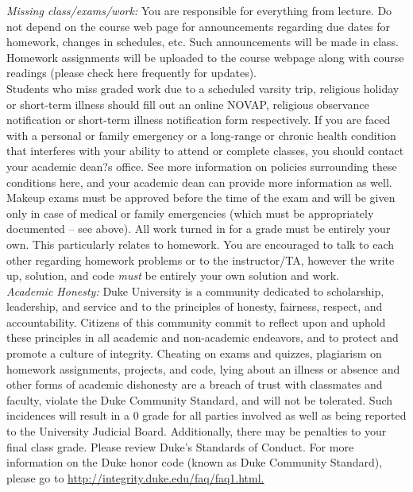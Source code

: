 \documentclass[11pt]{article}
\begin{document}


\emph{Missing class/exams/work:}
You are responsible for everything from lecture. Do not depend on the course web page for announcements regarding due dates for homework, changes in schedules, etc. Such announcements will be made in class. Homework assignments will be uploaded to the course webpage along with course readings (please check here frequently for updates).\\

Students who miss graded work due to a scheduled varsity trip, religious holiday or short-term illness should fill out an online NOVAP, religious observance notification or short-term illness notification form respectively. If you are faced with a personal or family emergency or a long-range or chronic health condition that interferes with your ability to attend or complete classes, you should contact your academic dean?s office. See more information on policies surrounding these conditions here, and your academic dean can provide more information as well.\\

Makeup exams must be approved before the time of the exam and will be given only in case
of medical or family emergencies (which must be appropriately documented -- see above). All work turned in for a grade must be entirely your own. This particularly relates to homework. You are encouraged to talk to each other regarding homework problems or to the instructor/TA, however the write up, solution, and code \emph{must} be entirely your own solution and work. \\


\emph{Academic Honesty:} Duke University is a community dedicated to scholarship, leadership, and service and to the principles of honesty, fairness, respect, and accountability. Citizens of this community commit to reflect upon and uphold these principles in all academic and non-academic endeavors, and to protect and promote a culture of integrity. Cheating on exams and quizzes, plagiarism on homework assignments, projects, and code, lying about an illness or absence and other forms of academic dishonesty are a breach of trust with classmates and faculty, violate the Duke Community Standard, and will not be tolerated. Such incidences will result in a 0 grade for all parties involved as well as being reported to the University Judicial Board. Additionally, there may be penalties to your final class grade. Please review Duke's Standards of Conduct.
For more information on the Duke honor code (known as Duke Community Standard), please go to \url{http://integrity.duke.edu/faq/faq1.html.}\\
\end{document}
